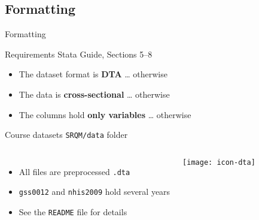 \documentclass[t]{beamer}
\begin{document}
	\subsection{Formatting}
	
	\begin{frame}[t]{Formatting}
	
	  \begin{block}{Requirements \hfill Stata Guide, Sections 5--8}

			\begin{itemize}
				\item The dataset format is \textbf{DTA} \hfill %
				… otherwise 
				
				\item The data is \textbf{cross-sectional} \hfill %
				… otherwise 
			
				\item The columns hold \textbf{only variables} \hfill %
				… otherwise 
			\end{itemize}

    \end{block}
		
	  \begin{block}{Course datasets \hfill \texttt{SRQM/data} folder}

			\begin{columns}[T]


					\begin{itemize}
						\item All files are preprocessed \texttt{.dta}				
						\item \texttt{gss0012} and \texttt{nhis2009} hold several years
						\item See the \texttt{README} file for details
					\end{itemize}
				
				
					\begin{center}
						\vspace{-1.5em}
						\texttt{[image: icon-dta]}
					\end{center}
				
			\end{columns}

    \end{block}
		
	\end{frame}
	
\end{document}
